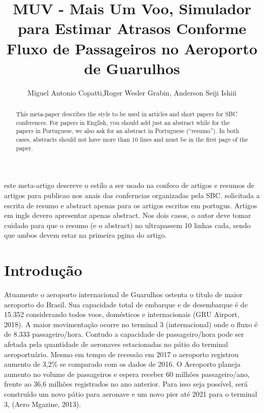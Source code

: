 \documentclass[12pt]{article}
\title{MUV - Mais Um Voo, Simulador para Estimar Atrasos Conforme Fluxo de
  Passageiros no Aeroporto de Guarulhos}
\author{Miguel Antonio Copatti\inst{1},Roger Wesler Grabin\inst{2}, Anderson Seiji Ishiii\inst{3}}
\begin{document}
 

\maketitle

\begin{abstract}
  This meta-paper describes the style to be used in articles and short papers
  for SBC conferences. For papers in English, you should add just an abstract
  while for the papers in Portuguese, we also ask for an abstract in
  Portuguese (``resumo''). In both cases, abstracts should not have more than
  10 lines and must be in the first page of the paper.
\end{abstract}
     
\begin{resumo} 


  este meta-artigo descreve o estilo a ser usado na confeco de artigos e
  resumos de artigos para publicao nos anais das conferncias organizadas
  pela SBC. solicitada a escrita de resumo e abstract apenas para os artigos
  escritos em portugus. Artigos em ingls devero apresentar apenas abstract.
  Nos dois casos, o autor deve tomar cuidado para que o resumo (e o abstract)
  no ultrapassem 10 linhas cada, sendo que ambos devem estar na primeira
  pgina do artigo.
\end{resumo}


\section{Introdução}

  Atuamente o aeroporto internacional de Guarulhos ostenta o título de maior
  aeroporto do Brasil. Sua capacidade total de embarque e de desembarque é
  de 15.352 considerando todos voos, domésticos e internacionais (GRU Airport, 2018).
  A maior movimentação ocorre no terminal 3 (internacional) onde o fluxo  é de
  8.333 passageiro/hora. Contudo a capacidade de passageiro/hora pode ser 
  afetada pela quantidade de aeronaves estacionadas no pátio do terminal
  aeroportuário. Mesmo em tempo de recessão em 2017 o aeroporto registrou 
  aumento de 3,2\% se comparado com os dados de 2016. O Aeroporto planeja
  aumento no volume de passageiros e espera receber 60 milhões passageiro/ano,
  frente ao 36,6 milhões registrados no ano anterior. Para isso seja possível,
  será construído um novo pátio para aeronave e um novo pier até 2021 para o 
  terminal 3, (Aero Mgazine, 2013).
\end{document}
